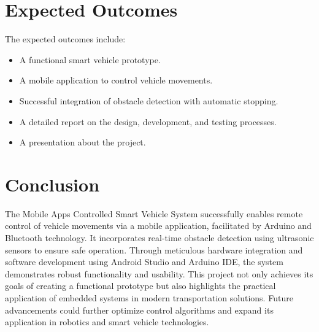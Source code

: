 \documentclass[12pt,a4paper]{article}
\begin{document}
\section{Expected Outcomes}
\label{sec:expected_outcomes}
The expected outcomes include:
\begin{itemize}
    \item A functional smart vehicle prototype.
    \item A mobile application to control vehicle movements.
    \item Successful integration of obstacle detection with automatic stopping.
    \item A detailed report on the design, development, and testing processes.
    \item A presentation about the project.
\end{itemize}

\section{Conclusion}

The Mobile Apps Controlled Smart Vehicle System successfully enables remote control of vehicle movements via a mobile application, facilitated by Arduino and Bluetooth technology. It incorporates real-time obstacle detection using ultrasonic sensors to ensure safe operation. Through meticulous hardware integration and software development using Android Studio and Arduino IDE, the system demonstrates robust functionality and usability. This project not only achieves its goals of creating a functional prototype but also highlights the practical application of embedded systems in modern transportation solutions. Future advancements could further optimize control algorithms and expand its application in robotics and smart vehicle technologies.
\end{document}
